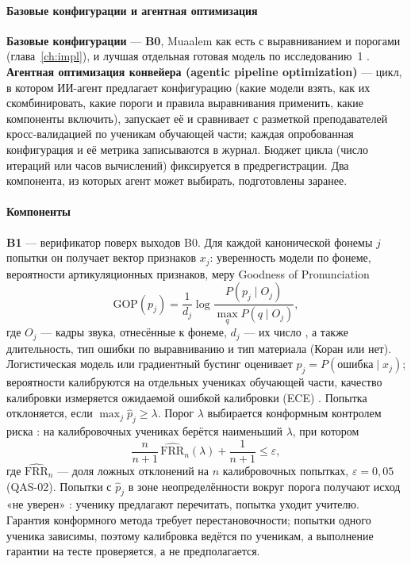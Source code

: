 \paragraph{Базовые конфигурации и агентная оптимизация} \textbf{Базовые конфигурации} --- \textbf{B0}, Muaalem как есть с
выравниванием и порогами (глава~\ref{ch:impl}), и лучшая отдельная готовая модель по исследованию~1
. \textbf{Агентная оптимизация конвейера (agentic pipeline optimization)} --- цикл, в котором ИИ-агент предлагает конфигурацию (какие модели взять, как их скомбинировать, какие пороги и правила
выравнивания применить, какие компоненты включить), запускает её и сравнивает с разметкой преподавателей
кросс-валидацией по ученикам обучающей части; каждая опробованная конфигурация и её метрика записываются в
журнал. Бюджет цикла (число итераций или часов вычислений) фиксируется в предрегистрации. Два компонента, из
которых агент может выбирать, подготовлены заранее.

\paragraph{Компоненты} \textbf{B1} --- верификатор поверх выходов B0. Для каждой
канонической фонемы $j$ попытки он получает вектор признаков $x_j$: уверенность модели по фонеме,
вероятности артикуляционных признаков, меру Goodness of Pronunciation
\begin{equation}
  \mathrm{GOP}(p_j) = \frac{1}{d_j}\log\frac{P(p_j\mid O_j)}{\max_{q} P(q\mid O_j)},
\end{equation}
где $O_j$ --- кадры звука, отнесённые к фонеме, $d_j$ --- их число \cite{SRC-115}, а также длительность, тип
ошибки по выравниванию и тип материала (Коран или нет). Логистическая модель или градиентный бустинг
оценивает $\hat p_j = P(\text{ошибка}\mid x_j)$; вероятности калибруются на отдельных учениках обучающей
части, качество калибровки измеряется ожидаемой ошибкой калибровки (ECE) \cite{SRC-112}. Попытка
отклоняется, если $\max_j \hat p_j \ge \lambda$. Порог $\lambda$ выбирается конформным контролем риска
\cite{SRC-114}: на калибровочных учениках берётся наименьший $\lambda$, при котором
\begin{equation}
  \frac{n}{n+1}\,\widehat{\mathrm{FRR}}_n(\lambda) + \frac{1}{n+1} \le \varepsilon,
\end{equation}
где $\widehat{\mathrm{FRR}}_n$ --- доля ложных отклонений на $n$ калибровочных попытках, $\varepsilon=0{,}05$
(QAS-02). Попытки с $\hat p_j$ в зоне неопределённости вокруг порога получают исход «не уверен»
\cite{SRC-117}: ученику предлагают перечитать, попытка уходит учителю. Гарантия конформного метода
требует перестановочности; попытки одного ученика зависимы, поэтому калибровка ведётся по ученикам, а
выполнение гарантии на тесте проверяется, а не предполагается.

